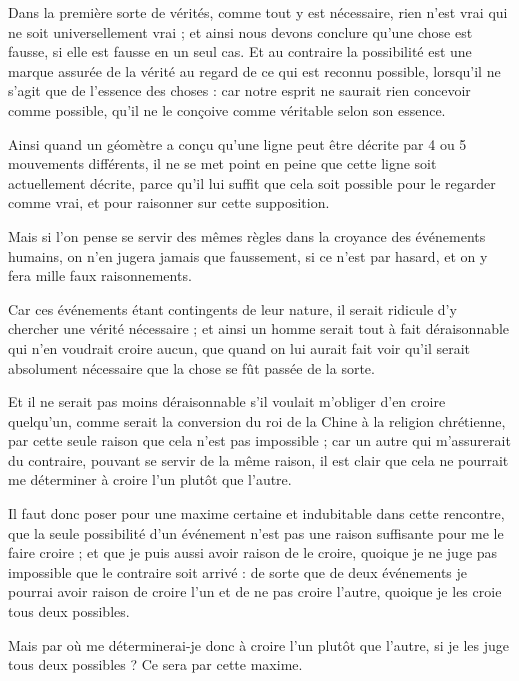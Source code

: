 Dans la première sorte de vérités, comme tout y est nécessaire, rien n'est vrai qui ne soit universellement vrai ; et ainsi nous devons conclure qu'une chose est fausse, si elle est fausse en un seul cas. Et au contraire la possibilité est une marque assurée de la vérité au regard de ce qui est reconnu possible, lorsqu'il ne s'agit que de l'essence des choses : car notre esprit ne saurait rien concevoir comme possible, qu'il ne le conçoive comme véritable selon son essence.

Ainsi quand un géomètre a conçu qu'une ligne peut être décrite par 4 ou 5 mouvements différents, il ne se met point en peine que cette ligne soit actuellement décrite, parce qu'il lui suffit que cela soit possible pour le regarder comme vrai, et pour raisonner sur cette supposition.

Mais si l'on pense se servir des mêmes règles dans la croyance des événements humains, on n'en jugera jamais que faussement, si ce n'est par hasard, et on y fera mille faux raisonnements.

Car ces événements étant contingents de leur nature, il serait ridicule d'y chercher une vérité nécessaire ; et ainsi un homme serait tout à fait déraisonnable qui n'en voudrait croire aucun, que quand on lui aurait fait voir qu'il serait absolument nécessaire que la chose se fût passée de la sorte.

Et il ne serait pas moins déraisonnable s'il voulait m'obliger d'en croire quelqu'un, comme serait la conversion du roi de la Chine à la religion chrétienne, par cette seule raison que cela n'est pas impossible ; car un autre qui m'assurerait du contraire, pouvant se servir de la même raison, il est clair que cela ne pourrait me déterminer à croire l'un plutôt que l'autre.

Il faut donc poser pour une maxime certaine et indubitable dans cette rencontre, que la seule possibilité d'un événement n'est pas une raison suffisante pour me le faire croire ; et que je puis aussi avoir raison de le croire, quoique je ne juge pas impossible que le contraire soit arrivé : de sorte que de deux événements je pourrai avoir raison de croire l'un et de ne pas croire l'autre, quoique je les croie tous deux possibles.

Mais par où me déterminerai-je donc à croire l'un plutôt que l'autre, si je les juge tous deux possibles ? Ce sera par cette maxime.

